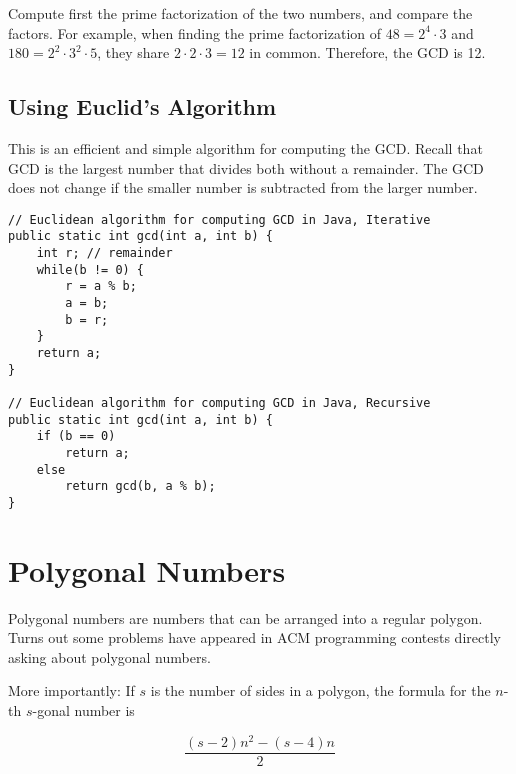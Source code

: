 Compute first the prime factorization of the two numbers, and compare the factors. For example, when finding the prime factorization of $48 = 2^4 \cdot 3$ and $180 = 2^2 \cdot 3^2 \cdot 5$, they share $2 \cdot 2 \cdot 3 = 12$ in common. Therefore, the GCD is 12.

\subsection{Using Euclid's Algorithm}

This is an efficient and simple algorithm for computing the GCD. Recall that GCD is the largest number that divides both without a remainder. The GCD does not change if the smaller number is subtracted from the larger number. 

\lstset{
	language=java,
	tabsize=4,
	basicstyle=\footnotesize,
}
\begin{lstlisting}
// Euclidean algorithm for computing GCD in Java, Iterative
public static int gcd(int a, int b) {
    int r; // remainder
    while(b != 0) { 
        r = a % b;
        a = b;
        b = r;
    }
    return a;
}

// Euclidean algorithm for computing GCD in Java, Recursive
public static int gcd(int a, int b) {
	if (b == 0)
		return a;
	else
		return gcd(b, a % b);
}
\end{lstlisting}

\section{Polygonal Numbers}

Polygonal numbers are numbers that can be arranged into a regular polygon. Turns out some problems have appeared in ACM programming contests directly asking about polygonal numbers. 

More importantly: If $s$ is the number of sides in a polygon, the formula for the $n$-th $s$-gonal number is

\[\dfrac{(s-2)n^2-(s-4)n}{2}\]

